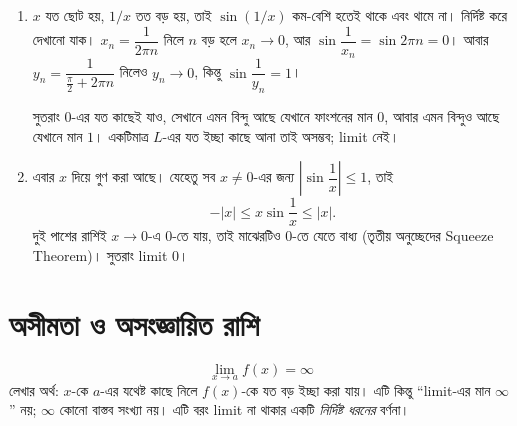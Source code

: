 \documentclass[11pt]{article}
\begin{document}
\begin{sol}
\begin{enumerate}
  \item $x$ যত ছোট হয়, $1/x$ তত বড় হয়, তাই $\sin(1/x)$ কম-বেশি হতেই থাকে এবং
        থামে না। নির্দিষ্ট করে দেখানো যাক। $x_{n} = \dfrac{1}{2\pi n}$ নিলে
        $n$ বড় হলে $x_{n} \to 0$, আর $\sin\dfrac{1}{x_{n}} = \sin 2\pi n = 0$।
        আবার $y_{n} = \dfrac{1}{\tfrac{\pi}{2} + 2\pi n}$ নিলেও $y_{n} \to 0$,
        কিন্তু $\sin\dfrac{1}{y_{n}} = 1$।

        সুতরাং $0$-এর যত কাছেই যাও, সেখানে এমন বিন্দু আছে যেখানে ফাংশনের মান
        $0$, আবার এমন বিন্দুও আছে যেখানে মান $1$। একটিমাত্র $L$-এর যত ইচ্ছা কাছে 
        আনা তাই অসম্ভব; limit নেই।
  \item এবার $x$ দিয়ে গুণ করা আছে। যেহেতু সব $x \neq 0$-এর জন্য
        $\left| \sin\dfrac{1}{x} \right| \leq 1$, তাই
        \[
          -|x| \leq x\sin\frac{1}{x} \leq |x| .
        \]
        দুই পাশের রাশিই $x \to 0$-এ $0$-তে যায়, তাই মাঝেরটিও $0$-তে যেতে
        বাধ্য (তৃতীয় অনুচ্ছেদের Squeeze Theorem)। সুতরাং limit $0$।
\end{enumerate}

\end{sol}

\section{অসীমতা ও অসংজ্ঞায়িত রাশি}

\begin{idea}[অসীম limit]
\[
  \lim_{x \to a} f(x) = \infty
\]
লেখার অর্থ: $x$-কে $a$-এর যথেষ্ট কাছে নিলে $f(x)$-কে যত বড় ইচ্ছা করা যায়।
এটি কিন্তু ``limit-এর মান $\infty$'' নয়; $\infty$ কোনো বাস্তব সংখ্যা নয়।
এটি বরং limit না থাকার একটি \emph{নির্দিষ্ট ধরনের} বর্ণনা।
\end{idea}

\begin{center}
\end{center}
\end{document}
